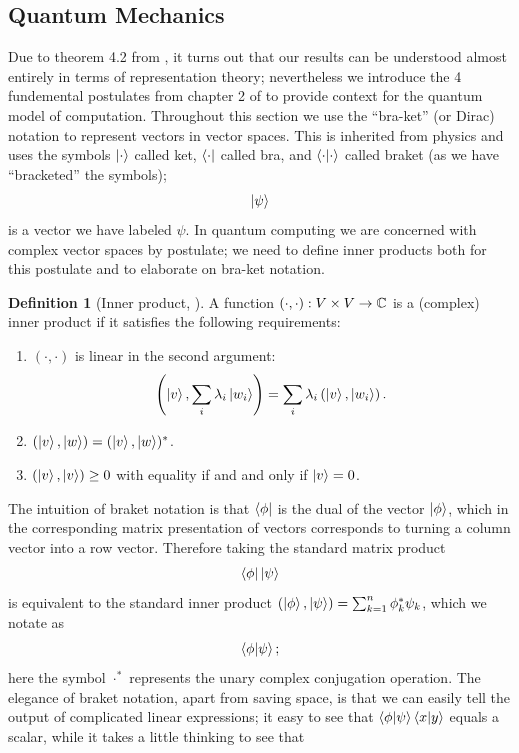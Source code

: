 \documentclass[12pt,twoside]{reedthesis}
\theoremstyle{plain}   %
\theoremstyle{definition}
\newtheorem{defn}{Definition}[section]
\theoremstyle{remark}
\numberwithin{equation}{section}
\begin{document}
   \subsection{Quantum Mechanics}
   Due to theorem 4.2 from \cite{copeland}, it turns out that our results can be understood almost entirely in terms of representation theory;
   nevertheless we introduce the 4 fundemental postulates from chapter 2 of \cite{nielsen2010} to provide context for the quantum model of computation.
   Throughout this section we use the ``bra-ket'' (or Dirac) notation to represent vectors in vector spaces. This is inherited from physics and uses the symbols
   $\ket{\cdot}$ called ket, $\bra{\cdot}$ called bra, and $\braket{\cdot | \cdot}$ called braket (as we have ``bracketed'' the symbols); 
   \[ \ket{\psi} \]
   is a vector we have labeled $\psi$. In quantum computing we are concerned with complex vector spaces by postulate; we need to define inner products both for this postulate and to elaborate on bra-ket notation.
   \begin{defn}[{Inner product, \cite[2.1.4]{nielsen2010}}]
     A function $(\cdot, \cdot): V \times V \to \mathbb{C}$ is a (complex) inner product if it satisfies the following requirements:
     \begin{enumerate}
     \item $(\cdot, \cdot)$ is linear in the second argument:
       \[ \left( \ket{v}, \sum_i \lambda_i \ket{w_i} \right) = \sum_i \lambda_i \left( \ket{v}, \ket{w_i} \right).\]
     \item $(\ket{v}, \ket{w}) = (\ket{v}, \ket{w})^*$.
     \item $(\ket{v}, \ket{v}) \geq 0$ with equality if and and only if $\ket{v} = 0$.
     \end{enumerate}
   \end{defn}
   The intuition of braket notation is that $\bra{\phi}$ is the dual of the vector $\ket{\phi}$, which in the corresponding matrix presentation
   of vectors corresponds to turning a column vector into a row vector. Therefore taking the standard matrix product
   \[\bra{\phi} \ket{\psi}\]
   is equivalent to the standard inner product $(\ket{\phi}, \ket{\psi}) = \sum_{k=1}^n \phi_k^* \psi_k$, which we notate as
   \[\braket{\phi | \psi};\]
   here the symbol $\cdot^*$ represents the unary complex conjugation operation.
   The elegance of braket notation, apart from saving space, is that we can easily tell the output of complicated linear expressions; it easy to see that $\braket{\phi | \psi} \braket{x | y}$ equals a scalar, while it takes a little thinking to see that
\end{document}
